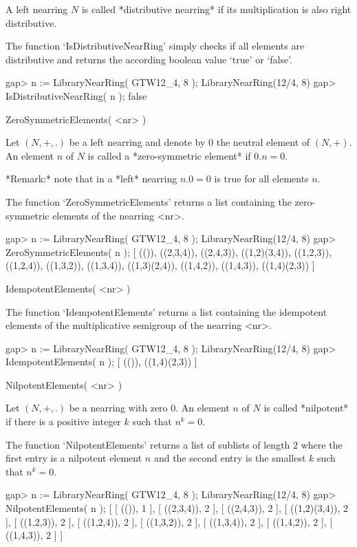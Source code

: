 A left nearring $N$ is called *distributive nearring* if its
multiplication is also right distributive.

The function `IsDistributiveNearRing' simply checks if all elements
are distributive and returns the according boolean value 
`true' or `false'.

\beginexample
    gap> n := LibraryNearRing( GTW12_4, 8 );            
    LibraryNearRing(12/4, 8)
    gap> IsDistributiveNearRing( n );
    false
\endexample



\>ZeroSymmetricElements( <nr> )

Let $(N,+,.)$ be a left nearring and denote by $0$ the neutral element 
of $(N,+)$. 
An element $n$ of $N$ is called a *zero-symmetric element* if $0.n = 0$. 

*Remark:* note that in a *left* nearring $n.0 = 0$ is true for all elements
$n$.

The function `ZeroSymmetricElements' returns a list containing the 
zero-symmetric elements of the nearring <nr>. 

\beginexample
    gap> n := LibraryNearRing( GTW12_4, 8 );            
    LibraryNearRing(12/4, 8)
    gap> ZeroSymmetricElements( n );
    [ (()), ((2,3,4)), ((2,4,3)), ((1,2)(3,4)), ((1,2,3)), ((1,2,4)), 
      ((1,3,2)), ((1,3,4)), ((1,3)(2,4)), ((1,4,2)), ((1,4,3)), 
      ((1,4)(2,3)) ]
\endexample

\>IdempotentElements( <nr> )

The function `IdempotentElements' returns a list containing the 
idempotent elements of the multiplicative semigroup of the nearring <nr>. 

\beginexample
    gap> n := LibraryNearRing( GTW12_4, 8 );            
    LibraryNearRing(12/4, 8)
    gap> IdempotentElements( n );
    [ (()), ((1,4)(2,3)) ]
\endexample

\>NilpotentElements( <nr> )

Let $(N,+,.)$ be a nearring with zero $0$. An element $n$ of $N$ is 
called *nilpotent* if there is a positive integer $k$ such that
$n^k = 0$.

The function `NilpotentElements' returns a list of sublists of length 
$2$ where the first entry is a nilpotent element $n$ and the second
entry is the smallest $k$ such that $n^k = 0$.

\beginexample
    gap> n := LibraryNearRing( GTW12_4, 8 );            
    LibraryNearRing(12/4, 8)
    gap> NilpotentElements( n );
    [ [ (()), 1 ], [ ((2,3,4)), 2 ], [ ((2,4,3)), 2 ], 
      [ ((1,2)(3,4)), 2 ], [ ((1,2,3)), 2 ], [ ((1,2,4)), 2 ], 
      [ ((1,3,2)), 2 ], [ ((1,3,4)), 2 ], [ ((1,4,2)), 2 ], 
      [ ((1,4,3)), 2 ] ]
\endexample

